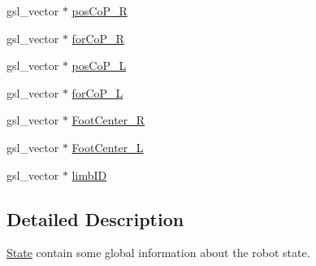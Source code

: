 \begin{DoxyCompactItemize}
\item 
gsl\-\_\-vector $\ast$ \hyperlink{struct_state_afc53045e2ea4e9521ec9608a84ee8b1f}{pos\-Co\-P\-\_\-\-R}
\item 
gsl\-\_\-vector $\ast$ \hyperlink{struct_state_a9bfd73cabe3e218b5e5079b181cc01a1}{for\-Co\-P\-\_\-\-R}
\item 
gsl\-\_\-vector $\ast$ \hyperlink{struct_state_a251c7ab891911d7972645a9e87be3384}{pos\-Co\-P\-\_\-\-L}
\item 
gsl\-\_\-vector $\ast$ \hyperlink{struct_state_a19d113450a14578f13b0ba9d4877f1b7}{for\-Co\-P\-\_\-\-L}
\item 
gsl\-\_\-vector $\ast$ \hyperlink{struct_state_a51184d897ab6397cf45b437fb882b8b1}{Foot\-Center\-\_\-\-R}
\item 
gsl\-\_\-vector $\ast$ \hyperlink{struct_state_a7ff3e7422300d409b859408677fe0430}{Foot\-Center\-\_\-\-L}
\item 
gsl\-\_\-vector $\ast$ \hyperlink{struct_state_a1064297106518125c173bb04ca3a61b2}{limb\-I\-D}
\end{DoxyCompactItemize}


\subsection{Detailed Description}
\hyperlink{struct_state}{State} contain some global information about the robot state. 

